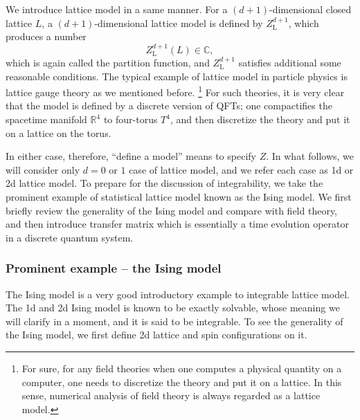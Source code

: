 We introduce lattice model in a same manner. For a $(d+1)$-dimensional
closed lattice $L$, a $(d+1)$-dimensional lattice model is defined
by $Z_{\mathrm{L}}^{d+1}$, which produces a number
\begin{equation}
  Z_{\mathrm{L}}^{d+1}(L)  \in  \mathbb{C},
\label{eq:lattice_Z}
\end{equation}
which is again called the partition function, and $Z_{\mathrm{L}}^{d+1}$
satisfies additional some reasonable conditions. The typical
example of lattice model in particle physics is lattice gauge theory
as we mentioned before.%
%
\footnote{For sure, for any field theories when one computes a physical quantity
on a computer, one needs to discretize the theory and put it on a
lattice. In this sense, numerical analysis of field theory is always
regarded as a lattice model. }
%
For such theories, it is very clear that the model is defined by
a discrete version of QFTs; one compactifies the spacetime manifold
$\mathbb{R}^{4}$ to four-torus $T^{4}$, and then discretize the
theory and put it on a lattice on the torus.

In either case, therefore, ``define a model'' means to specify $Z$.
In what follows, we will consider only $d=0$ or $1$ case of
lattice model, and we refer each case as 1d or 2d lattice model. To
prepare for the discussion of integrability, we take the prominent
example of statistical lattice model known as the Ising model. We first
briefly review the generality of the Ising model and compare with
field theory, and then introduce transfer matrix which is essentially
a time evolution operator in a discrete quantum system.





\subsubsection{Prominent example -- the Ising model}

The Ising model is a very good introductory example to integrable lattice
model. The 1d and 2d Ising model is known to be exactly solvable,
whose meaning we will clarify in a moment, and it is said to be integrable.
To see the generality of the Ising model, we first define 2d lattice
and spin configurations on it.

